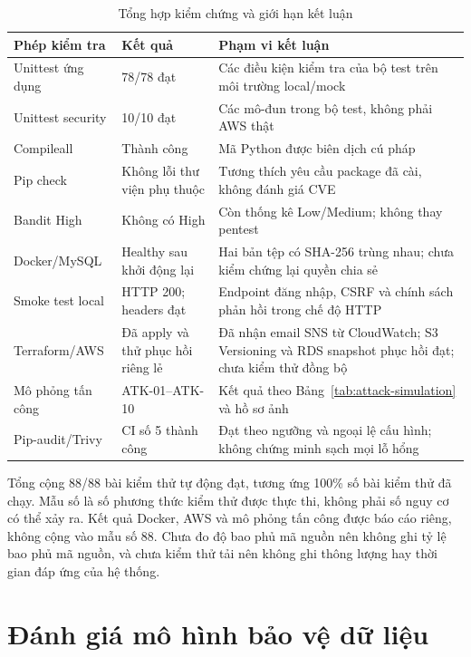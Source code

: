 \begin{table}[htbp]\centering\small
\caption{Tổng hợp kiểm chứng và giới hạn kết luận}
\begin{tabularx}{\textwidth}{P{3.3cm}P{2.5cm}X}\toprule
\textbf{Phép kiểm tra}&\textbf{Kết quả}&\textbf{Phạm vi kết luận}\\\midrule
Unittest ứng dụng & 78/78 đạt & Các điều kiện kiểm tra của bộ test trên môi trường local/mock\\
Unittest security & 10/10 đạt & Các mô-đun trong bộ test, không phải AWS thật\\
Compileall & Thành công & Mã Python được biên dịch cú pháp\\
Pip check & Không lỗi thư viện phụ thuộc & Tương thích yêu cầu package đã cài, không đánh giá CVE\\
Bandit High & Không có High & Còn thống kê Low/Medium; không thay pentest\\
Docker/MySQL & Healthy sau khởi động lại & Hai bản tệp có SHA-256 trùng nhau; chưa kiểm chứng lại quyền chia sẻ\\
Smoke test local & HTTP 200; headers đạt & Endpoint đăng nhập, CSRF và chính sách phản hồi trong chế độ HTTP\\
Terraform/AWS & Đã apply và thử phục hồi riêng lẻ & Đã nhận email SNS từ CloudWatch; S3 Versioning và RDS snapshot phục hồi đạt; chưa kiểm thử đồng bộ\\
Mô phỏng tấn công & ATK-01--ATK-10 & Kết quả theo Bảng~\ref{tab:attack-simulation} và hồ sơ ảnh\\
Pip-audit/Trivy & CI số 5 thành công & Đạt theo ngưỡng và ngoại lệ cấu hình; không chứng minh sạch mọi lỗ hổng\\\bottomrule
\end{tabularx}\end{table}
Tổng cộng 88/88 bài kiểm thử tự động đạt, tương ứng 100\% số bài kiểm thử đã chạy. Mẫu số là số phương thức kiểm thử được thực thi, không phải số nguy cơ có thể xảy ra. Kết quả Docker, AWS và mô phỏng tấn công được báo cáo riêng, không cộng vào mẫu số 88. Chưa đo độ bao phủ mã nguồn nên không ghi tỷ lệ bao phủ mã nguồn, và chưa kiểm thử tải nên không ghi thông lượng hay thời gian đáp ứng của hệ thống.

\section{Đánh giá mô hình bảo vệ dữ liệu}

